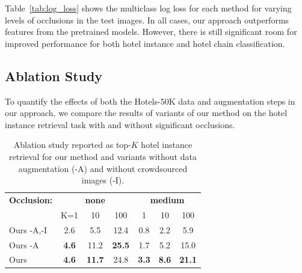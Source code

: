 Table~\ref{tab:log_loss} shows the multiclass log loss for each method for varying levels of occlusions in the test images. 
In all cases, our approach outperforms features from the pretrained models. However, there is still significant room 
for improved performance for both hotel instance and hotel chain classification. 

\subsection{Ablation Study}
To quantify the effects of both the Hotels-50K data and
augmentation steps in our approach, we compare the
results of variants of our method on the hotel instance
retrieval task with and without significant occlusions.

\begin{table}
    \centering
    \begin{tabular}{c|ccc|ccc|}
        \multicolumn{1}{r}{\textbf{Occlusion:}} & \multicolumn{3}{c}{\textbf{none}} & \multicolumn{3}{c}{\textbf{medium}} \\
        \cline{2-7}
        \multicolumn{1}{c|}{} & K=1 & 10 & 100 & 1 & 10 & 100 \\
        \cline{1-7}
        \multicolumn{1}{|l|}{Ours -A,-I} & 2.6 & 5.5 & 12.4 & 0.8 & 2.2 & 5.9\\
        \multicolumn{1}{|l|}{Ours -A} & \textbf{4.6} & 11.2 & \textbf{25.5} & 1.7 & 5.2 & 15.0 \\
        \multicolumn{1}{|l|}{Ours} & \textbf{4.6} & \textbf{11.7} & 24.8 & \textbf{3.3} & \textbf{8.6} & \textbf{21.1}\\
        \cline{1-7}
    \end{tabular}
    
    \caption{Ablation study reported as top-$K$ hotel instance retrieval for our method and variants without data augmentation (-A) and without crowdsourced images (-I).}
    \label{tab:ablationStudy}
\end{table}

